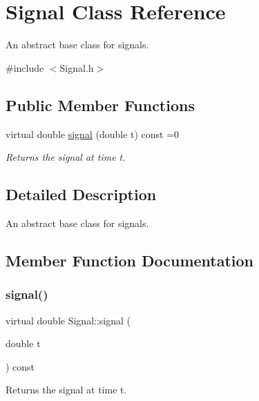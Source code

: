 \hypertarget{classSignal}{}\section{Signal Class Reference}
\label{classSignal}


An abstract base class for signals.  




{\ttfamily \#include $<$Signal.\+h$>$}

\subsection*{Public Member Functions}
\begin{DoxyCompactItemize}
\item 
virtual double \hyperlink{classSignal_a32c22f17b70b215d78171716f844fa60}{signal} (double t) const =0
\begin{DoxyCompactList}\small\item\em Returns the signal at time t. \end{DoxyCompactList}\end{DoxyCompactItemize}


\subsection{Detailed Description}
An abstract base class for signals. 

\subsection{Member Function Documentation}
\mbox{\label{classSignal_a32c22f17b70b215d78171716f844fa60}} 
\subsubsection{\texorpdfstring{signal()}{signal()}}
{\footnotesize\ttfamily virtual double Signal\+::signal (\begin{DoxyParamCaption}\item[{double}]{t }\end{DoxyParamCaption}) const\hspace{0.3cm}{\ttfamily [pure virtual]}}



Returns the signal at time t. 


